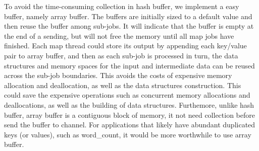 To avoid the time-consuming collection in hash buffer, 
we implement a easy buffer, namely array buffer.
The buffers are initially sized to a default value and 
then reuse the buffer among sub-jobs.
It will indicate that the buffer is empty at the end of a sending, 
but will not free the memory until all map jobs have finished.
Each map thread could store its output 
by appending each key/value pair to array buffer, 
and then as each sub-job is processed in turn,
the data structures and memory spaces 
for the input and intermediate data can be reused across the sub-job boundaries. 
This avoids the costs of expensive memory allocation and deallocation, 
as well as the data structures construction.
This could save the expensive operations 
such as concurrent memory allocations and deallocations,
as well as the building of data structures.
Furthemore, unlike hash buffer, array buffer is a contiguous block of memory,
it not need collection before send the buffer to channel.
For applications that likely have abundant duplicated keys (or values),
such as word\_count, it would be more worthwhile to use array buffer.






